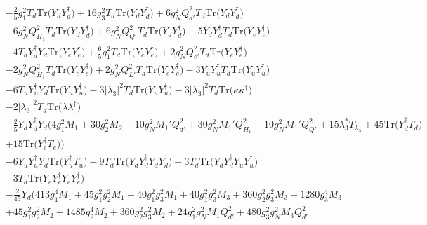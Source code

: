 {\begin{align}
 &-\frac{2}{5} g_{1}^{2} T_d \mbox{Tr}\Big({Y_d  Y_{d}^{\dagger}}\Big) +16 g_{3}^{2} T_d \mbox{Tr}\Big({Y_d  Y_{d}^{\dagger}}\Big) +6 g_{N}^{2} Q_{d'}^{2} T_d \mbox{Tr}\Big({Y_d  Y_{d}^{\dagger}}\Big) \nonumber \\ 
 &-6 g_{N}^{2} Q_{H_1}^{2} T_d \mbox{Tr}\Big({Y_d  Y_{d}^{\dagger}}\Big) +6 g_{N}^{2} Q_{Q'}^{2} T_d \mbox{Tr}\Big({Y_d  Y_{d}^{\dagger}}\Big) -5 {Y_d  Y_{d}^{\dagger}  T_d} \mbox{Tr}\Big({Y_e  Y_{e}^{\dagger}}\Big) \nonumber \\ 
 &-4 {T_d  Y_{d}^{\dagger}  Y_d} \mbox{Tr}\Big({Y_e  Y_{e}^{\dagger}}\Big) +\frac{6}{5} g_{1}^{2} T_d \mbox{Tr}\Big({Y_e  Y_{e}^{\dagger}}\Big) +2 g_{N}^{2} Q_{e'}^{2} T_d \mbox{Tr}\Big({Y_e  Y_{e}^{\dagger}}\Big) \nonumber \\ 
 &-2 g_{N}^{2} Q_{H_1}^{2} T_d \mbox{Tr}\Big({Y_e  Y_{e}^{\dagger}}\Big) +2 g_{N}^{2} Q_{L'}^{2} T_d \mbox{Tr}\Big({Y_e  Y_{e}^{\dagger}}\Big) -3 {Y_u  Y_{u}^{\dagger}  T_d} \mbox{Tr}\Big({Y_u  Y_{u}^{\dagger}}\Big) \nonumber \\ 
 &-6 {T_u  Y_{u}^{\dagger}  Y_d} \mbox{Tr}\Big({Y_u  Y_{u}^{\dagger}}\Big) -3 |\lambda_3|^2 T_d \mbox{Tr}\Big({Y_u  Y_{u}^{\dagger}}\Big) -3 |\lambda_3|^2 T_d \mbox{Tr}\Big({\kappa  \kappa^{\dagger}}\Big) \nonumber \\ 
 &-2 |\lambda_3|^2 T_d \mbox{Tr}\Big({\lambda  \lambda^{\dagger}}\Big) \nonumber \\ 
 &-\frac{2}{5} {Y_d  Y_{d}^{\dagger}  Y_d} \Big(4 g_{1}^{2} M_1 +30 g_{2}^{2} M_2 -10 g_{N}^{2} M_1' Q_{d'}^{2} +30 g_{N}^{2} M_1' Q_{H_1}^{2} +10 g_{N}^{2} M_1' Q_{Q'}^{2} +15 \lambda_3^* T_{\lambda_3} +45 \mbox{Tr}\Big({Y_{d}^{\dagger}  T_d}\Big) \nonumber \\ 
 &+15 \mbox{Tr}\Big({Y_{e}^{\dagger}  T_e}\Big) \Big)\nonumber \\ 
 &-6 {Y_u  Y_{u}^{\dagger}  Y_d} \mbox{Tr}\Big({Y_{u}^{\dagger}  T_u}\Big) -9 T_d \mbox{Tr}\Big({Y_d  Y_{d}^{\dagger}  Y_d  Y_{d}^{\dagger}}\Big) -3 T_d \mbox{Tr}\Big({Y_d  Y_{d}^{\dagger}  Y_u  Y_{u}^{\dagger}}\Big) \nonumber \\ 
 &-3 T_d \mbox{Tr}\Big({Y_e  Y_{e}^{\dagger}  Y_e  Y_{e}^{\dagger}}\Big) \nonumber \\ 
 &-\frac{2}{45} Y_d \Big(413 g_{1}^{4} M_1 +45 g_{1}^{2} g_{2}^{2} M_1 +40 g_{1}^{2} g_{3}^{2} M_1 +40 g_{1}^{2} g_{3}^{2} M_3 +360 g_{2}^{2} g_{3}^{2} M_3 +1280 g_{3}^{4} M_3 \nonumber \\ 
 &+45 g_{1}^{2} g_{2}^{2} M_2 +1485 g_{2}^{4} M_2 +360 g_{2}^{2} g_{3}^{2} M_2 +24 g_{1}^{2} g_{N}^{2} M_1 Q_{d'}^{2} +480 g_{3}^{2} g_{N}^{2} M_3 Q_{d'}^{2} \nonumber \\ 

\end{align}}
